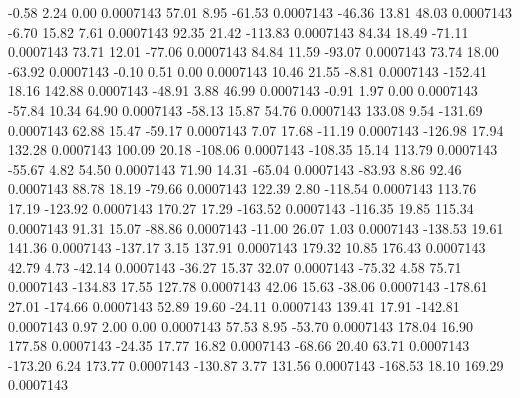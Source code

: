        -0.58        2.24        0.00     0.0007143
       57.01        8.95      -61.53     0.0007143
      -46.36       13.81       48.03     0.0007143
       -6.70       15.82        7.61     0.0007143
       92.35       21.42     -113.83     0.0007143
       84.34       18.49      -71.11     0.0007143
       73.71       12.01      -77.06     0.0007143
       84.84       11.59      -93.07     0.0007143
       73.74       18.00      -63.92     0.0007143
       -0.10        0.51        0.00     0.0007143
       10.46       21.55       -8.81     0.0007143
     -152.41       18.16      142.88     0.0007143
      -48.91        3.88       46.99     0.0007143
       -0.91        1.97        0.00     0.0007143
      -57.84       10.34       64.90     0.0007143
      -58.13       15.87       54.76     0.0007143
      133.08        9.54     -131.69     0.0007143
       62.88       15.47      -59.17     0.0007143
        7.07       17.68      -11.19     0.0007143
     -126.98       17.94      132.28     0.0007143
      100.09       20.18     -108.06     0.0007143
     -108.35       15.14      113.79     0.0007143
      -55.67        4.82       54.50     0.0007143
       71.90       14.31      -65.04     0.0007143
      -83.93        8.86       92.46     0.0007143
       88.78       18.19      -79.66     0.0007143
      122.39        2.80     -118.54     0.0007143
      113.76       17.19     -123.92     0.0007143
      170.27       17.29     -163.52     0.0007143
     -116.35       19.85      115.34     0.0007143
       91.31       15.07      -88.86     0.0007143
      -11.00       26.07        1.03     0.0007143
     -138.53       19.61      141.36     0.0007143
     -137.17        3.15      137.91     0.0007143
      179.32       10.85      176.43     0.0007143
       42.79        4.73      -42.14     0.0007143
      -36.27       15.37       32.07     0.0007143
      -75.32        4.58       75.71     0.0007143
     -134.83       17.55      127.78     0.0007143
       42.06       15.63      -38.06     0.0007143
     -178.61       27.01     -174.66     0.0007143
       52.89       19.60      -24.11     0.0007143
      139.41       17.91     -142.81     0.0007143
        0.97        2.00        0.00     0.0007143
       57.53        8.95      -53.70     0.0007143
      178.04       16.90      177.58     0.0007143
      -24.35       17.77       16.82     0.0007143
      -68.66       20.40       63.71     0.0007143
     -173.20        6.24      173.77     0.0007143
     -130.87        3.77      131.56     0.0007143
     -168.53       18.10      169.29     0.0007143
